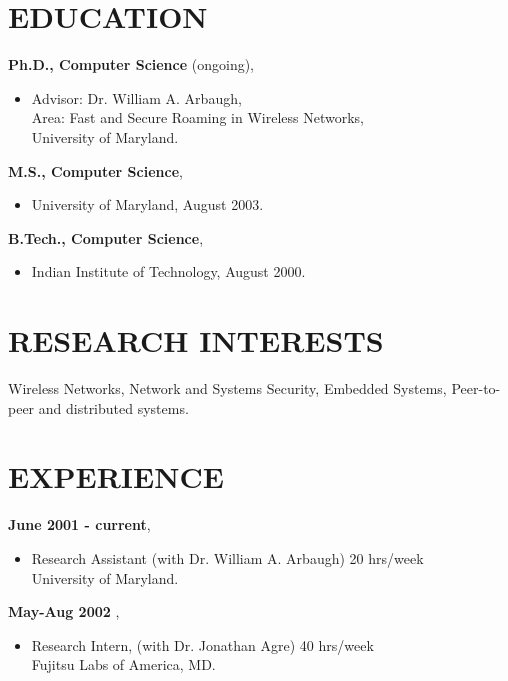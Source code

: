 \begin{resume}
\vspace{0.1in}

\section{EDUCATION}
\vspace{0.1in} 
{\bf Ph.D., Computer Science}  (ongoing),
    \begin{itemize}
         \item[] Advisor: Dr. William A. Arbaugh, \\
		 Area: Fast and Secure Roaming in Wireless Networks,\\
                 University of Maryland.
    \end{itemize}

{\bf M.S., Computer Science},   	
    \begin{itemize}
         \item[] University of Maryland, August 2003.
    \end{itemize}

{\bf B.Tech., Computer Science},
    \begin{itemize}
          \item[] Indian Institute of Technology, August 2000.
    \end{itemize}

 
\section{RESEARCH INTERESTS} 

\vspace{0.1in}
 Wireless Networks, Network and Systems Security, Embedded Systems, Peer-to-peer and distributed systems.


\section{EXPERIENCE} 
\vspace{0.1in}
 {\bf June 2001 - current},   	
    \begin{itemize}
         \item[] Research Assistant (with Dr. William A. Arbaugh) 20 hrs/week \\
                 University of Maryland.
    \end{itemize}

 {\bf May-Aug 2002 },   	
    \begin{itemize}
         \item[] Research Intern, (with Dr. Jonathan Agre) 40 hrs/week \\
	         Fujitsu Labs of America, MD.
    \end{itemize}


\end{resume}
